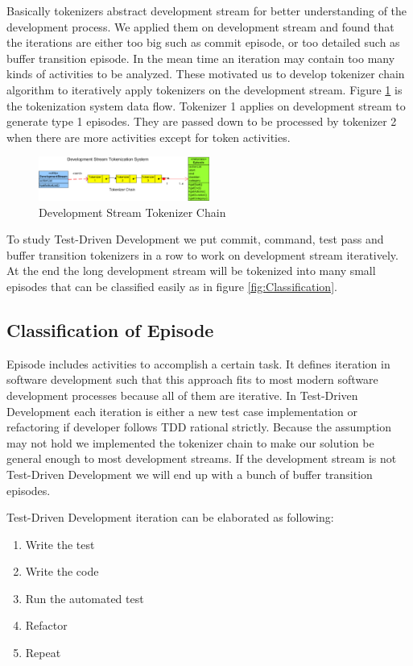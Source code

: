 \documentclass[11pt,twocolumn]{article}
\begin{document}
Basically tokenizers abstract development stream for better understanding
of the development process. We applied them on development stream and found
that the iterations are either too big such as commit episode, or too
detailed such as buffer transition episode. In the mean time an iteration
may contain too many kinds of activities to be analyzed. These motivated us
to develop tokenizer chain algorithm to iteratively apply tokenizers on the
development stream. Figure \ref{fig:TokenizerChain} is the tokenization
system data flow. Tokenizer 1 applies on development stream to generate
type 1 episodes. They are passed down to be processed by tokenizer 2 when
there are more activities except for token activities.

\begin{figure}[ht] 
  \centering
  \includegraphics[width=0.5\textwidth]{picture/Tokenization.eps}
  \caption{Development Stream Tokenizer Chain}\label{fig:TokenizerChain}
\end{figure} 

To study Test-Driven Development we put commit, command, test pass and
buffer transition tokenizers in a row to work on development stream
iteratively. At the end the long development stream will be tokenized into
many small episodes that can be classified easily as in figure
\ref{fig:Classification}.

\subsection{Classification of Episode}
Episode includes activities to accomplish a certain task. It defines
iteration in software development such that this approach fits to most
modern software development processes because all of them are iterative. In
Test-Driven Development each iteration is either a new test case
implementation or refactoring if developer follows TDD rational strictly.
Because the assumption may not hold we implemented the tokenizer chain to
make our solution be general enough to most development streams. If the
development stream is not Test-Driven Development we will end up with a
bunch of buffer transition episodes.

Test-Driven Development iteration can be elaborated as following\cite{Beck:03}:
\begin{enumerate}
\item Write the test
\item Write the code
\item Run the automated test
\item Refactor
\item Repeat
\end{enumerate}
\end{document}
